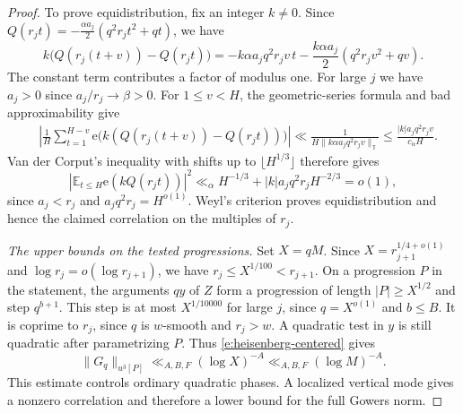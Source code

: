 \documentclass[12pt]{amsart}
\newcommand{\1}{\mathbf 1}
\newcommand{\e}{\mathrm e}
\theoremstyle{definition}
\begin{document}
\begin{proof}
To prove equidistribution, fix an integer \(k\ne0\). Since
\(Q(r_jt)=-\frac{\alpha a_j}{2}(q^2r_jt^2+qt)\), we have
\[
 k\bigl(Q(r_j(t+v))-Q(r_jt)\bigr)
 =-k\alpha a_jq^2r_jv\,t
  -\frac{k\alpha a_j}{2}(q^2r_jv^2+qv).
\]
The constant term contributes a factor of modulus one. For large \(j\) we have \(a_j>0\) since \(a_j/r_j\to\beta>0\). For
\(1\leq v<H\), the geometric-series formula and bad approximability
give
\[
\begin{aligned}
 &\left|\frac1H\sum_{t=1}^{H-v}
    \e\bigl(k(Q(r_j(t+v))-Q(r_jt))\bigr)\right|\ll
 \frac{1}{H\|k\alpha a_jq^2r_jv\|_{\mathbb T}}
 \leq \frac{|k|a_jq^2r_jv}{c_\alpha H}.
\end{aligned}
\]
Van der Corput's inequality with shifts up to
\(\lfloor H^{1/3}\rfloor\) therefore gives
\[
 \left|\mathbb E_{t\leq H}\e(kQ(r_jt))\right|^2
 \ll_\alpha H^{-1/3}+|k|a_jq^2r_jH^{-2/3}=o(1),
\]
since \(a_j<r_j\) and \(a_jq^2r_j=H^{o(1)}\).
Weyl's criterion proves equidistribution and hence the claimed
correlation on the multiples of \(r_j\).



\medskip
\noindent\emph{The upper bounds on the tested progressions.}
Set \(X=qM\). Since \(X=r_{j+1}^{1/4+o(1)}\) and
\(\log r_j=o(\log r_{j+1})\), we have
\(r_j\leq X^{1/100}<r_{j+1}\). On a progression \(P\) in the
statement, the arguments \(qy\) of \(Z\) form a progression
of length \(|P|\geq X^{1/2}\) and step \(q^{b+1}\).
This step is at most \(X^{1/10000}\) for large \(j\), since
\(q=X^{o(1)}\) and \(b\leq B\). It is coprime to \(r_j\),
since \(q\) is \(w\)-smooth and \(r_j>w\). A quadratic test
in \(y\) is still quadratic after parametrizing \(P\).
Thus \eqref{e:heisenberg-centered} gives
\[
 \|G_q\|_{u^3[P]}\ll_{A,B,F}(\log X)^{-A}
 \ll_{A,B,F}(\log M)^{-A}.
\]
This estimate controls ordinary quadratic phases.
A localized vertical mode gives a nonzero correlation and
therefore a lower bound for the full Gowers norm.

\medskip


\end{proof}
\end{document}
